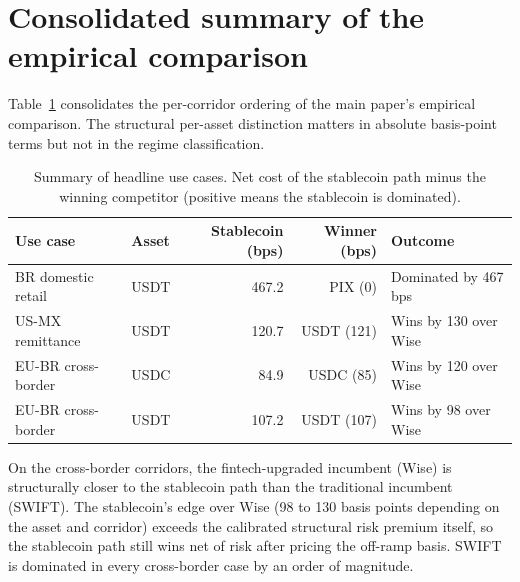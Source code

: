 \section{Consolidated summary of the empirical comparison}\label{ia:summary_uc}

Table~\ref{tab:summary_uc} consolidates the per-corridor ordering of the main paper's empirical comparison. The structural per-asset distinction matters in absolute basis-point terms but not in the regime classification.

\begin{table}[H]
\centering
\caption{Summary of headline use cases. Net cost of the stablecoin path minus the winning competitor (positive means the stablecoin is dominated).}\label{tab:summary_uc}
\begin{tabular}{llrrl}
\toprule
Use case & Asset & Stablecoin (bps) & Winner (bps) & Outcome \\
\midrule
BR domestic retail    & USDT & 467.2 & PIX (0)          & Dominated by 467 bps \\
US-MX remittance      & USDT & 120.7 & USDT (121)       & Wins by 130 over Wise \\
EU-BR cross-border    & USDC & 84.9  & USDC (85)        & Wins by 120 over Wise \\
EU-BR cross-border    & USDT & 107.2 & USDT (107)       & Wins by 98 over Wise \\
\bottomrule
\end{tabular}
\end{table}

On the cross-border corridors, the fintech-upgraded incumbent (Wise) is structurally closer to the stablecoin path than the traditional incumbent (SWIFT). The stablecoin's edge over Wise (98 to 130 basis points depending on the asset and corridor) exceeds the calibrated structural risk premium itself, so the stablecoin path still wins net of risk after pricing the off-ramp basis. SWIFT is dominated in every cross-border case by an order of magnitude.
